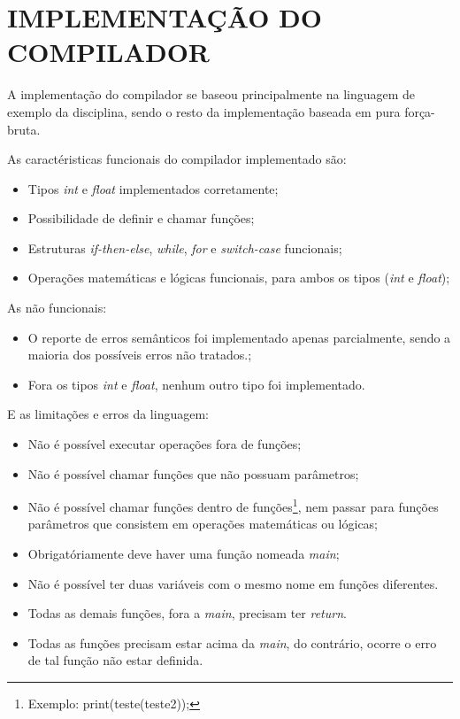 \section{\normalsize IMPLEMENTAÇÃO DO COMPILADOR}
	A implementação do compilador se baseou principalmente na linguagem de exemplo da disciplina, sendo o resto da implementação baseada em pura força-bruta.
	
	As caractéristicas funcionais do compilador implementado são:
	
	\begin{itemize}
		\item Tipos \textit{int} e \textit{float} implementados corretamente;
		\item Possibilidade de definir e chamar funções;
		\item Estruturas \textit{if-then-else}, \textit{while}, \textit{for} e \textit{switch-case} funcionais;
		\item Operações matemáticas e lógicas funcionais, para ambos os tipos (\textit{int} e \textit{float});
	\end{itemize}
	
	As não funcionais:
	\begin{itemize}
		\item O reporte de erros semânticos foi implementado apenas parcialmente, sendo a maioria dos possíveis erros não tratados.;
		\item Fora os tipos \textit{int} e \textit{float}, nenhum outro tipo foi implementado.
	\end{itemize}
	
	E as limitações e erros da linguagem:
	\begin{itemize}
		\item Não é possível executar operações fora de funções;
		\item Não é possível chamar funções que não possuam parâmetros;
		\item Não é possível chamar funções dentro de funções\footnote{Exemplo: print(teste(teste2));}, nem passar para funções parâmetros que consistem em operações matemáticas ou lógicas;
		\item Obrigatóriamente deve haver uma função nomeada \textit{main};
		\item Não é possível ter duas variáveis com o mesmo nome em funções diferentes.
		\item Todas as demais funções, fora a \textit{main}, precisam ter \textit{return}.
		\item Todas as funções precisam estar acima da \textit{main}, do contrário, ocorre o erro de tal função não estar definida.
	\end{itemize}